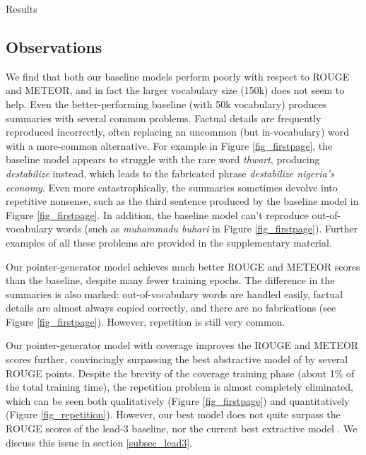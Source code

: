 \documentclass[11pt,a4paper]{article}
\begin{document}
\begin{section}{Results}
\subsection{Observations}
We find that both our baseline models perform poorly with respect to ROUGE and METEOR, and in fact the larger vocabulary size (150k) does not seem to help.
Even the better-performing baseline (with 50k vocabulary) produces summaries with several common problems.
Factual details are frequently reproduced incorrectly, often replacing an uncommon (but in-vocabulary) word with a more-common alternative.
For example in Figure \ref{fig_firstpage}, the baseline model appears to struggle with the rare word \textit{thwart}, producing \textit{destabilize} instead, which leads to the fabricated phrase \textit{destabilize nigeria's economy}.
Even more catastrophically, the summaries sometimes devolve into repetitive nonsense, such as the third sentence produced by the baseline model in Figure \ref{fig_firstpage}.
In addition, the baseline model can't reproduce out-of-vocabulary words (such as \textit{muhammadu buhari} in Figure \ref{fig_firstpage}).
Further examples of all these problems are provided in the supplementary material.

Our pointer-generator model achieves much better ROUGE and METEOR scores than the baseline, despite many fewer training epochs.
The difference in the summaries is also marked: out-of-vocabulary words are handled easily, factual details are almost always copied correctly, and there are no fabrications (see Figure \ref{fig_firstpage}). 
However, repetition is still very common.

Our pointer-generator model with coverage improves the ROUGE and METEOR scores further, convincingly surpassing the best abstractive model of \citeauthor{nallapati2016abstractive}  by several ROUGE points.
Despite the brevity of the coverage training phase (about 1\% of the total training time), the repetition problem is almost completely eliminated, which can be seen both qualitatively (Figure \ref{fig_firstpage}) and quantitatively (Figure \ref{fig_repetition}).
However, our best model does not quite surpass the ROUGE scores of the
lead-3 baseline, nor the current best extractive model \cite{nallapati2016summarunner}.
We discuss this issue in section \ref{subsec_lead3}.

\end{section} 
\end{document}
